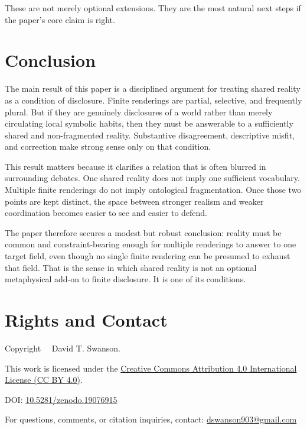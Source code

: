 \documentclass[11pt]{article}
\begin{document}
These are not merely optional extensions. They are the most natural next steps if the paper's core claim is right.

\section{Conclusion}

The main result of this paper is a disciplined argument for treating shared reality as a condition of disclosure. Finite renderings are partial, selective, and frequently plural. But if they are genuinely disclosures of a world rather than merely circulating local symbolic habits, then they must be answerable to a sufficiently shared and non-fragmented reality. Substantive disagreement, descriptive misfit, and correction make strong sense only on that condition.

This result matters because it clarifies a relation that is often blurred in surrounding debates. One shared reality does not imply one sufficient vocabulary. Multiple finite renderings do not imply ontological fragmentation. Once those two points are kept distinct, the space between stronger realism and weaker coordination becomes easier to see and easier to defend.

The paper therefore secures a modest but robust conclusion: reality must be common and constraint-bearing enough for multiple renderings to answer to one target field, even though no single finite rendering can be presumed to exhaust that field. That is the sense in which shared reality is not an optional metaphysical add-on to finite disclosure. It is one of its conditions.



\section*{Rights and Contact}

\noindent
Copyright \textcopyright\ \the\year\ David T. Swanson.

\noindent
This work is licensed under the
\href{https://creativecommons.org/licenses/by/4.0/}
{Creative Commons Attribution 4.0 International License (CC BY 4.0)}.

\noindent
DOI:
\href{https://doi.org/10.5281/zenodo.19076915}{10.5281/zenodo.19076915}

\noindent
For questions, comments, or citation inquiries, contact:
\href{mailto:dswanson903@gmail.com}{dswanson903@gmail.com}
\end{document}
